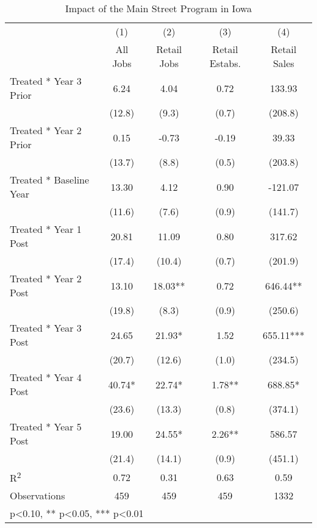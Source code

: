 \begin{table}[htbp]\centering
\def\sym#1{\ifmmode^{#1}\else\(^{#1}\)\fi}
\caption{Impact of the Main Street Program in Iowa}
\begin{tabular}{l*{4}{c}}
\hline\hline
            &\multicolumn{1}{c}{(1)}   &\multicolumn{1}{c}{(2)}   &\multicolumn{1}{c}{(3)}   &\multicolumn{1}{c}{(4)}   \\
            &    All Jobs   & Retail Jobs   &Retail Estabs.   &Retail Sales   \\
\hline
Treated * Year 3 Prior&        6.24   &        4.04   &        0.72   &      133.93   \\
            &      (12.8)   &       (9.3)   &       (0.7)   &     (208.8)   \\
Treated * Year 2 Prior&        0.15   &       -0.73   &       -0.19   &       39.33   \\
            &      (13.7)   &       (8.8)   &       (0.5)   &     (203.8)   \\
Treated * Baseline Year&       13.30   &        4.12   &        0.90   &     -121.07   \\
            &      (11.6)   &       (7.6)   &       (0.9)   &     (141.7)   \\
Treated * Year 1 Post&       20.81   &       11.09   &        0.80   &      317.62   \\
            &      (17.4)   &      (10.4)   &       (0.7)   &     (201.9)   \\
Treated * Year 2 Post&       13.10   &       18.03** &        0.72   &      646.44** \\
            &      (19.8)   &       (8.3)   &       (0.9)   &     (250.6)   \\
Treated * Year 3 Post&       24.65   &       21.93*  &        1.52   &      655.11***\\
            &      (20.7)   &      (12.6)   &       (1.0)   &     (234.5)   \\
Treated * Year 4 Post&       40.74*  &       22.74*  &        1.78** &      688.85*  \\
            &      (23.6)   &      (13.3)   &       (0.8)   &     (374.1)   \\
Treated * Year 5 Post&       19.00   &       24.55*  &        2.26** &      586.57   \\
            &      (21.4)   &      (14.1)   &       (0.9)   &     (451.1)   \\
\hline
R\textsuperscript{2}&        0.72   &        0.31   &        0.63   &        0.59   \\
Observations&         459   &         459   &         459   &        1332   \\
\hline\hline
\multicolumn{5}{l}{\footnotesize * p<0.10, ** p<0.05, *** p<0.01}\\
\end{tabular}
\end{table}
